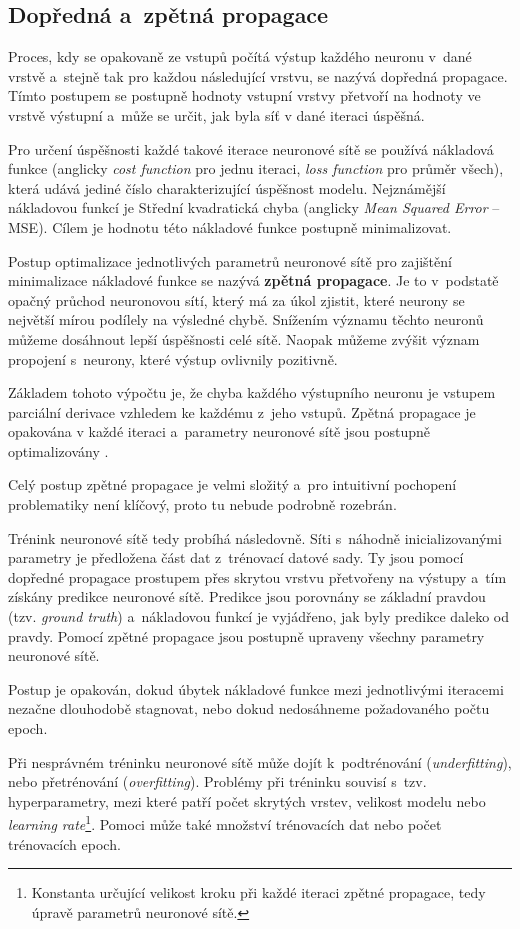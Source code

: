 \subsection{Dopředná a~zpětná propagace}
Proces, kdy se opakovaně ze vstupů počítá výstup každého neuronu v~dané vrstvě a~stejně tak pro každou následující vrstvu, se nazývá dopředná propagace. Tímto postupem se postupně hodnoty vstupní vrstvy přetvoří na hodnoty ve vrstvě výstupní a~může se určit, jak byla síť v dané iteraci úspěšná.\par
Pro určení úspěšnosti každé takové iterace neuronové sítě se používá nákladová funkce (anglicky \textit{cost function} pro jednu iteraci, \textit{loss function} pro průměr všech), která udává jediné číslo charakterizující úspěšnost modelu. Nejznámější nákladovou funkcí je Střední kvadratická chyba (anglicky \textit{Mean Squared Error} -- MSE). Cílem je hodnotu této nákladové funkce postupně minimalizovat.\par \medskip
Postup optimalizace jednotlivých parametrů neuronové sítě pro zajištění minimalizace nákladové funkce se nazývá \textbf{zpětná propagace}. Je to v~podstatě opačný průchod neuronovou sítí, který má za úkol zjistit, které neurony se největší mírou podílely na výsledné chybě. Snížením významu těchto neuronů můžeme dosáhnout lepší úspěšnosti celé sítě. Naopak můžeme zvýšit význam propojení s~neurony, které výstup ovlivnily pozitivně.\par
Základem tohoto výpočtu je, že chyba každého výstupního neuronu je vstupem parciální derivace vzhledem ke každému z~jeho vstupů. Zpětná propagace je opakována v každé iteraci a~parametry neuronové sítě jsou postupně optimalizovány \cite{neural_nets}.\par
Celý postup zpětné propagace je velmi složitý a~pro intuitivní pochopení problematiky není klíčový, proto tu nebude podrobně rozebrán.\par
\medskip
Trénink neuronové sítě tedy probíhá následovně. Síti s~náhodně inicializovanými parametry je předložena část dat z~trénovací datové sady. Ty jsou pomocí dopředné propagace prostupem přes skrytou vrstvu přetvořeny na výstupy a~tím získány predikce neuronové sítě. Predikce jsou porovnány se základní pravdou (tzv. \emph{ground truth}) a~nákladovou funkcí je vyjádřeno, jak byly predikce daleko od pravdy. Pomocí zpětné propagace jsou postupně upraveny všechny parametry neuronové sítě.\par
Postup je opakován, dokud úbytek nákladové funkce mezi jednotlivými iteracemi nezačne dlouhodobě stagnovat, nebo dokud nedosáhneme požadovaného počtu epoch.\par
Při nesprávném tréninku neuronové sítě může dojít k~podtrénování (\textit{underfitting}), nebo přetrénování (\textit{overfitting}). Problémy při tréninku souvisí s~tzv. hyperparametry, mezi které patří počet skrytých vrstev, velikost modelu nebo \emph{learning rate}\footnote{Konstanta určující velikost kroku při každé iteraci zpětné propagace, tedy úpravě parametrů neuronové sítě.}. Pomoci může také množství trénovacích dat nebo počet trénovacích epoch.


